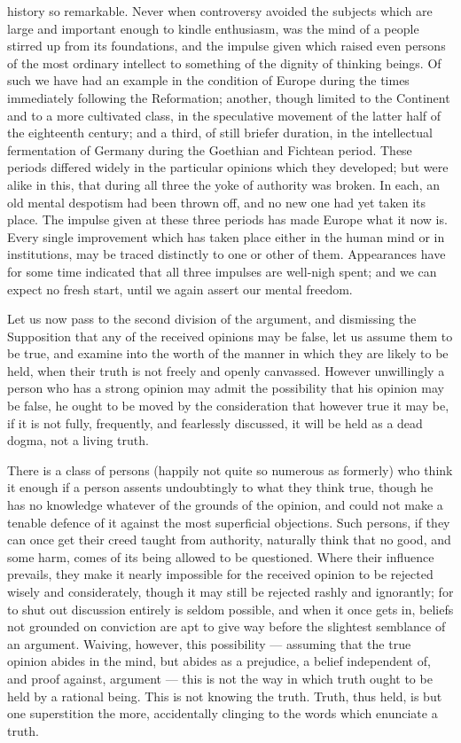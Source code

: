 \documentclass[12pt]{report}
\begin{document}
history so remarkable. Never when controversy avoided the subjects which are large and important enough to kindle enthusiasm, was the mind of a people stirred up from its foundations, and the impulse given which raised even persons of the most ordinary intellect to something of the dignity of thinking beings. Of such we have had an example in the condition of Europe during the times immediately following the Reformation; another, though limited to the Continent and to a more cultivated class, in the speculative movement of the latter half of the eighteenth century; and a third, of still briefer duration, in the intellectual fermentation of Germany during the Goethian and Fichtean period. These periods differed widely in the particular opinions which they developed; but were alike in this, that during all three the yoke of authority was broken. In each, an old mental despotism had been thrown off, and no new one had yet taken its place. The impulse given at these three periods has made Europe what it now is. Every single improvement which has taken place either in the human mind or in institutions, may be traced distinctly to one or other of them. Appearances have for some time indicated that all three impulses are well-nigh spent; and we can expect no fresh start, until we again assert our mental freedom.

Let us now pass to the second division of the argument, and dismissing the Supposition that any of the received opinions may be false, let us assume them to be true, and examine into the worth of the manner in which they are likely to be held, when their truth is not freely and openly canvassed. However unwillingly a person who has a strong opinion may admit the possibility that his opinion may be false, he ought to be moved by the consideration that however true it may be, if it is not fully, frequently, and fearlessly discussed, it will be held as a dead dogma, not a living truth.

There is a class of persons (happily not quite so numerous as formerly) who think it enough if a person assents undoubtingly to what they think true, though he has no knowledge whatever of the grounds of the opinion, and could not make a tenable defence of it against the most superficial objections. Such persons, if they can once get their creed taught from authority, naturally think that no good, and some harm, comes of its being allowed to be questioned. Where their influence prevails, they make it nearly impossible for the received opinion to be rejected wisely and considerately, though it may still be rejected rashly and ignorantly; for to shut out discussion entirely is seldom possible, and when it once gets in, beliefs not grounded on conviction are apt to give way before the slightest semblance of an argument. Waiving, however, this possibility — assuming that the true opinion abides in the mind, but abides as a prejudice, a belief independent of, and proof against, argument — this is not the way in which truth ought to be held by a rational being. This is not knowing the truth. Truth, thus held, is but one superstition the more, accidentally clinging to the words which enunciate a truth.
\end{document}
